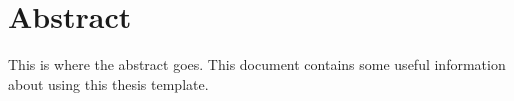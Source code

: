 \chapter*{Abstract}

This is where the abstract goes. This document contains some useful information about using this thesis template.


